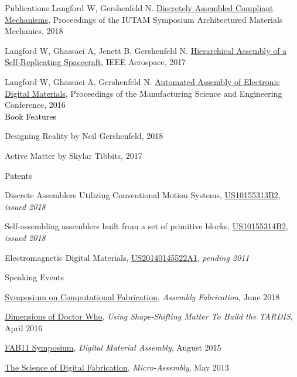 \documentclass{resume} %
\begin{document}
\begin{rSection}{Publications}
Langford W, Gershenfeld N. \href{https://docs.lib.purdue.edu/iutam/presentations/abstracts/45}{Discretely Assembled Compliant Mechanisms}, Proceedings of the IUTAM Symposium Architectured Materials Mechanics, 2018

Langford W, Ghassaei A, Jenett B, Gershenfeld N. \href{http://cba.mit.edu/docs/papers/17.04.11.SelfAssemSpacecraft.pdf}{Hierarchical Assembly of a Self-Replicating Spacecraft}, IEEE Aerospace, 2017

Langford W, Ghassaei A, Gershenfeld N. \href{http://cba.mit.edu/docs/papers/16.07.msec.stapler.pdf}{Automated Assembly of Electronic Digital Materials}, Proceedings of the Manufacturing Science and Engineering Conference, 2016
\sectionskip
\\\textcolor{black}{Book Features}

\begingroup\leftskip=0.7cm
Designing Reality by Neil Gershenfeld, 2018

Active Matter by Skylar Tibbits, 2017

\endgroup

\textcolor{black}{Patents}

\begingroup\leftskip=0.7cm


Discrete Assemblers Utilizing Conventional Motion Systems, \href{https://patents.google.com/patent/US10155313B2/}{US10155313B2}, {\em issued 2018}

Self-assembling assemblers %
built from a set of primitive blocks, \href{https://patents.google.com/patent/US10155314B2}{US10155314B2}, {\em issued 2018}

Electromagnetic Digital Materials, \href{https://patents.google.com/patent/US20140145522A1}{US20140145522A1}, {\em pending 2011}


\endgroup

\end{rSection}


\begin{rSection}{Speaking Events}

\href{http://cba.mit.edu/events/18.06.SCF/}{Symposium on Computational Fabrication}, {\em Assembly Fabrication}, June 2018

\href{https://mitmuseum.mit.edu/program/dimensions-doctor-who}{Dimensions of Doctor Who}, {\em Using Shape-Shifting Matter To Build the TARDIS}, April 2016

\href{http://fab11.fabevent.org/#}{FAB11 Symposium}, {\em Digital Material Assembly}, August 2015

\href{http://cba.mit.edu/events/13.03.scifab/index.html}{The Science of Digital Fabrication}, {\em Micro-Assembly}, May 2013

\end{rSection}
\end{document}
